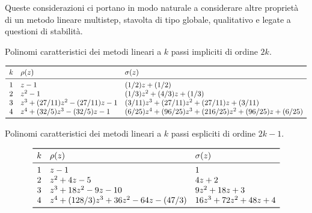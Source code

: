 Queste considerazioni ci portano in modo naturale a considerare altre
proprietà di un metodo lineare multistep, stavolta di tipo globale,
qualitativo e legate a questioni di stabilità.



\begin{table}[p]
\caption{Polinomi caratteristici dei metodi lineari
a $k$ passi impliciti di ordine $2k$.}
\label{tab:lmf-max-order-implicit-coefficients}
\vspace*{-2.5ex}
\begin{equation*}
\begin{array}{cll}
\toprule
k & \rho(z) & \sigma(z) \\
\midrule
1 & z-1                       & (1/2)z+(1/2) \\
2 & z^2-1                     & (1/3)z^2+(4/3)z+(1/3) \\
3 & z^3+(27/11)z^2-(27/11)z-1 & (3/11)z^3+(27/11)z^2+(27/11)z+(3/11) \\
4 & z^4+(32/5)z^3-(32/5)z-1   & (6/25)z^4+(96/25)z^3+(216/25)z^2+(96/25)z+(6/25) \\
\bottomrule
\end{array}
\end{equation*}
\end{table}

\begin{table}[p]
\caption{Polinomi caratteristici dei metodi lineari
a $k$ passi espliciti di ordine $2k-1$.}
\label{tab:lmf-max-order-explicit-coefficients}
\begin{equation*}
\begin{array}{cll}
\toprule
k & \rho(z) & \sigma(z) \\
\midrule
1 & z-1                             & 1 \\
2 & z^2+4z-5                        & 4z+2 \\
3 & z^3+18z^2-9z-10                 & 9z^2+18z+3 \\
4 & z^4+(128/3)z^3+36z^2-64z-(47/3) & 16z^3+72z^2+48z+4 \\
\bottomrule
\end{array}
\end{equation*}
\end{table}

\clearpage



